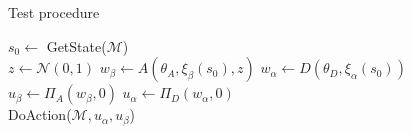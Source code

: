 \begin{algorithm}[H]
\caption{Test procedure}
\begin{algorithmic}[1]
        \State $s_0 \gets$ GetState($\mathcal{M}$)
        \\
        \State $z \gets \mathcal{N}(0,1)$
        \State $w_\beta \gets A(\theta_A, \xi_\beta(s_0), z)$
        \State $w_\alpha \gets D(\theta_D, \xi_\alpha(s_0))$
        \\
        \State $u_\beta \gets \Pi_A(w_\beta, 0)$
        \State $u_\alpha \gets \Pi_D(w_\alpha, 0)$
        \\
        \State DoAction($\mathcal{M}, u_\alpha, u_\beta$)
    \EndFor
\EndProcedure
\end{algorithmic}
\end{algorithm}
